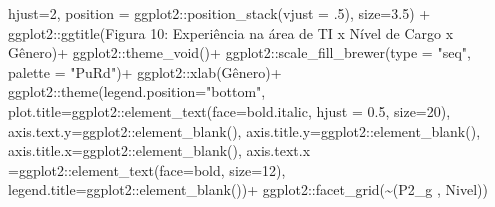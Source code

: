 \documentclass[
]{article}
\newenvironment{Shaded}{\begin{snugshade}}{\end{snugshade}}
\newcommand{\AttributeTok}[1]{\textcolor[rgb]{0.77,0.63,0.00}{#1}}
\newcommand{\DecValTok}[1]{\textcolor[rgb]{0.00,0.00,0.81}{#1}}
\newcommand{\FloatTok}[1]{\textcolor[rgb]{0.00,0.00,0.81}{#1}}
\newcommand{\FunctionTok}[1]{\textcolor[rgb]{0.00,0.00,0.00}{#1}}
\newcommand{\NormalTok}[1]{#1}
\newcommand{\SpecialCharTok}[1]{\textcolor[rgb]{0.00,0.00,0.00}{#1}}
\newcommand{\StringTok}[1]{\textcolor[rgb]{0.31,0.60,0.02}{#1}}
\begin{document}
\begin{Shaded}
\begin{Highlighting}[]
    \AttributeTok{hjust=}\DecValTok{2}\NormalTok{,}
    \AttributeTok{position =}\NormalTok{ ggplot2}\SpecialCharTok{::}\FunctionTok{position\_stack}\NormalTok{(}\AttributeTok{vjust =}\NormalTok{ .}\DecValTok{5}\NormalTok{),}
    \AttributeTok{size=}\FloatTok{3.5}\NormalTok{) }\SpecialCharTok{+}
\NormalTok{  ggplot2}\SpecialCharTok{::}\FunctionTok{ggtitle}\NormalTok{(}\StringTok{\textquotesingle{}Figura 10: Experiência na área de TI x Nível de Cargo x Gênero\textquotesingle{}}\NormalTok{)}\SpecialCharTok{+}
\NormalTok{  ggplot2}\SpecialCharTok{::}\FunctionTok{theme\_void}\NormalTok{()}\SpecialCharTok{+}
\NormalTok{  ggplot2}\SpecialCharTok{::}\FunctionTok{scale\_fill\_brewer}\NormalTok{(}\AttributeTok{type =} \StringTok{"seq"}\NormalTok{, }\AttributeTok{palette =} \StringTok{"PuRd"}\NormalTok{)}\SpecialCharTok{+}
\NormalTok{  ggplot2}\SpecialCharTok{::}\FunctionTok{xlab}\NormalTok{(}\StringTok{\textquotesingle{}Gênero\textquotesingle{}}\NormalTok{)}\SpecialCharTok{+}
\NormalTok{  ggplot2}\SpecialCharTok{::}\FunctionTok{theme}\NormalTok{(}\AttributeTok{legend.position=}\StringTok{"bottom"}\NormalTok{,}
                 \AttributeTok{plot.title=}\NormalTok{ggplot2}\SpecialCharTok{::}\FunctionTok{element\_text}\NormalTok{(}\AttributeTok{face=}\StringTok{\textquotesingle{}bold.italic\textquotesingle{}}\NormalTok{,}
                                                  \AttributeTok{hjust =} \FloatTok{0.5}\NormalTok{, }\AttributeTok{size=}\DecValTok{20}\NormalTok{),}
                 \AttributeTok{axis.text.y=}\NormalTok{ggplot2}\SpecialCharTok{::}\FunctionTok{element\_blank}\NormalTok{(),}
                 \AttributeTok{axis.title.y=}\NormalTok{ggplot2}\SpecialCharTok{::}\FunctionTok{element\_blank}\NormalTok{(),}
                 \AttributeTok{axis.title.x=}\NormalTok{ggplot2}\SpecialCharTok{::}\FunctionTok{element\_blank}\NormalTok{(),}
                 \AttributeTok{axis.text.x =}\NormalTok{ggplot2}\SpecialCharTok{::}\FunctionTok{element\_text}\NormalTok{(}\AttributeTok{face=}\StringTok{\textquotesingle{}bold\textquotesingle{}}\NormalTok{, }\AttributeTok{size=}\DecValTok{12}\NormalTok{),}
                 \AttributeTok{legend.title=}\NormalTok{ggplot2}\SpecialCharTok{::}\FunctionTok{element\_blank}\NormalTok{())}\SpecialCharTok{+}
\NormalTok{  ggplot2}\SpecialCharTok{::}\FunctionTok{facet\_grid}\NormalTok{(}\SpecialCharTok{\textasciitilde{}}\StringTok{\textasciigrave{}}\AttributeTok{(\textquotesingle{}P2\_g \textquotesingle{}, \textquotesingle{}Nivel\textquotesingle{})}\StringTok{\textasciigrave{}}\NormalTok{)}
\end{Highlighting}
\end{Shaded}
\end{document}
